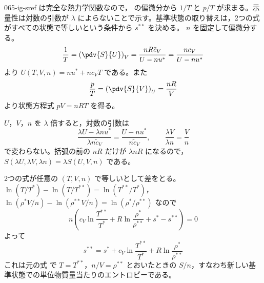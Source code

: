 \documentclass[uplatex,dvipdfmx,a4paper,11pt]{jsarticle}
\begin{document}
\begin{kaisetsu}{065-ig-sref}
\houshin {} は完全な熱力学関数なので， の偏微分から $1/T$ と $p/T$ が求まる。示量性は対数の引数が $\lambda$ によらないことで示す。基準状態の取り替えは，2つの式がすべての状態で等しいという条件から $s^{**}$ を決める。
\keisan {} $n$ を固定して偏微分する。
\[ \frac{1}{T} = \left(\pdv{S}{U}\right)_{V} = \frac{nR\tilde{c}_{V}}{U - nu^{*}} = \frac{nc_{V}}{U - nu^{*}} \]
より $U(T,V,n) = nu^{*} + nc_{V}T$ である。また
\[ \frac{p}{T} = \left(\pdv{S}{V}\right)_{U} = \frac{nR}{V} \]
より状態方程式 $pV = nRT$ を得る。

 $U$，$V$，$n$ を $\lambda$ 倍すると，対数の引数は
\[ \frac{\lambda U - \lambda nu^{*}}{\lambda n\tilde{c}_{V}} = \frac{U - nu^{*}}{n\tilde{c}_{V}}, \qquad \frac{\lambda V}{\lambda n} = \frac{V}{n} \]
で変わらない。括弧の前の $nR$ だけが $\lambda nR$ になるので，$S(\lambda U,\lambda V,\lambda n) = \lambda S(U,V,n)$ である。

 2つの式が任意の $(T,V,n)$ で等しいとして差をとる。$\ln(T/T^{*}) - \ln(T/T^{**}) = \ln(T^{**}/T^{*})$，$\ln(\rho^{*}V/n) - \ln(\rho^{**}V/n) = \ln(\rho^{*}/\rho^{**})$ なので
\[ n\left(c_{V}\ln\frac{T^{**}}{T^{*}} + R\ln\frac{\rho^{*}}{\rho^{**}} + s^{*} - s^{**}\right) = 0 \]
よって
\[ s^{**} = s^{*} + c_{V}\ln\frac{T^{**}}{T^{*}} + R\ln\frac{\rho^{*}}{\rho^{**}} \]
これは元の式  で $T = T^{**}$，$n/V = \rho^{**}$ とおいたときの $S/n$，すなわち新しい基準状態での単位物質量当たりのエントロピーである。


\end{kaisetsu}
\end{document}
